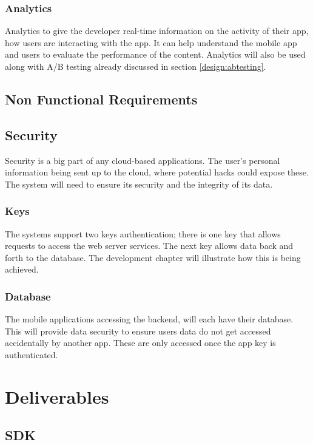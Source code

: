 \subsubsection{Analytics} \label{d-p:analytics}
Analytics to give the developer real-time information on the activity of their app, how users are interacting with the app. It can help understand the mobile app and users to evaluate the performance of the content. Analytics will also be used along with A/B testing already discussed in section \ref{design:abtesting}.

\subsection{Non Functional Requirements}

\subsection{Security}
Security is a big part of any cloud-based applications. The user's personal information being sent up to the cloud, where potential hacks could expose these. The system will need to ensure its security and the integrity of its data.

\subsubsection{Keys}
The systems support two keys authentication; there is one key that allows requests to access the web server services. The next key allows data back and forth to the database. The development chapter will illustrate how this is being achieved.

\subsubsection{Database}
The mobile applications accessing the backend, will each have their database. This will provide data security to ensure users data do not get accessed accidentally by another app. These are only accessed once the app key is authenticated.

\section{Deliverables}

\subsection{SDK}

